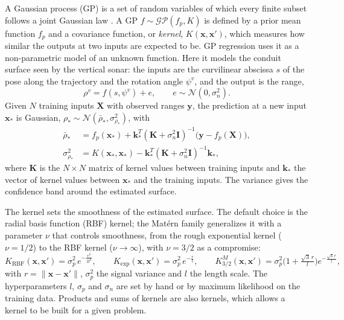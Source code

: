 A Gaussian process (GP) is a set of random variables of which every finite subset follows a joint
Gaussian law \citep{rasmussen2006gaussian}. A GP $f \sim \mathcal{GP}(f_p, K)$ is defined by a prior
mean function $f_p$ and a covariance function, or \emph{kernel}, $K(\mathbf{x}, \mathbf{x}')$, which
measures how similar the outputs at two inputs are expected to be. GP regression uses it as a
non-parametric model of an unknown function. Here it models the conduit surface seen by the
vertical sonar: the inputs are the curvilinear abscissa $s$ of the pose along the trajectory
and the rotation angle $\psi^v$, and the output is the range,
\begin{equation}                         %
  \rho^v = f(s, \psi^v) + e, \qquad e \sim \mathcal{N}(0, \sigma_n^2).
  \label{eq:def_gp_model}
\end{equation}
Given $N$ training inputs $\mathbf{X}$ with observed ranges $\mathbf{y}$, the prediction at a new input
$\mathbf{x}_*$ is Gaussian, $\rho_* \sim \mathcal{N}(\bar{\rho}_*, \sigma^2_{\rho_*})$, with
\begin{align}                            %
  \bar{\rho}_*      &= f_p(\mathbf{x}_*) + \mathbf{k}_*^T(\mathbf{K} + \sigma_n^2\mathbf{I})^{-1}
                       \big(\mathbf{y} - f_p(\mathbf{X})\big), \label{eq:def_gp_mean}\\
  \sigma^2_{\rho_*} &= K(\mathbf{x}_*, \mathbf{x}_*) - \mathbf{k}_*^T(\mathbf{K} +
                       \sigma_n^2\mathbf{I})^{-1}\mathbf{k}_*, \label{eq:def_gp_var}
\end{align}
where $\mathbf{K}$ is the $N\times N$ matrix of kernel values between training inputs and
$\mathbf{k}_*$ the vector of kernel values between $\mathbf{x}_*$ and the training inputs. The
variance gives the confidence band around the estimated surface.

The kernel sets the smoothness of the estimated surface. The default choice is the radial basis
function (RBF) kernel; the Mat\'ern family \citep{matern1986spatial} generalizes it with a parameter
$\nu$ that controls smoothness, from the rough exponential kernel ($\nu = 1/2$) to the RBF kernel
($\nu \to \infty$), with $\nu = 3/2$ as a compromise:
\begin{equation}                         %
  K_{\mathrm{RBF}}(\mathbf{x}, \mathbf{x}') = \sigma_p^2\, e^{-\frac{r^2}{2l^2}}, \qquad
  K_{\mathrm{exp}}(\mathbf{x}, \mathbf{x}') = \sigma_p^2\, e^{-\frac{r}{l}}, \qquad
  K^M_{3/2}(\mathbf{x}, \mathbf{x}') = \sigma_p^2 \Big(1 + \tfrac{\sqrt{3}\,r}{l}\Big)
                                       e^{-\frac{\sqrt{3}\,r}{l}},
  \label{eq:def_kernels}
\end{equation}
with $r = \|\mathbf{x} - \mathbf{x}'\|$, $\sigma_p^2$ the signal variance and $l$ the length scale.
The hyperparameters $l$, $\sigma_p$ and $\sigma_n$ are set by hand or by maximum likelihood on the
training data. Products and sums of kernels are also kernels, which allows a kernel to be built for
a given problem.

